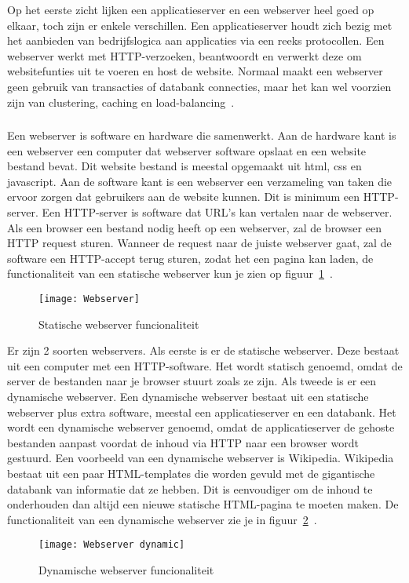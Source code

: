 Op het eerste zicht lijken een applicatieserver en een webserver heel goed op elkaar, toch zijn er enkele verschillen. Een applicatieserver houdt zich bezig met het aanbieden van bedrijfslogica aan applicaties via een reeks protocollen. Een webserver werkt met HTTP-verzoeken, beantwoordt en verwerkt deze om websitefunties uit te voeren en host de website. Normaal maakt een webserver geen gebruik van transacties of databank connecties, maar het kan wel voorzien zijn van clustering, caching en load-balancing~\autocite{ProTeam2018}.

\subsubsection{}
\label{subsubsec:Webserver}
Een webserver is software en hardware die samenwerkt. Aan de hardware kant is een webserver een computer dat webserver software opslaat en een website bestand bevat. Dit website bestand is meestal opgemaakt uit html, css en javascript. Aan de software kant is een webserver een verzameling van taken die ervoor zorgen dat gebruikers aan de website kunnen. Dit is minimum een HTTP-server. Een HTTP-server is software dat URL's kan vertalen naar de webserver. Als een browser een bestand nodig heeft op een webserver, zal de browser een HTTP request sturen. Wanneer de request naar de juiste webserver gaat, zal de software een HTTP-accept terug sturen, zodat het een pagina kan laden, de functionaliteit van een statische webserver kun je zien op figuur~\ref{fig:2.2}~\autocite{MDN2021}. 
\begin{figure}
    \texttt{[image: Webserver]}
    \caption{Statische webserver funcionaliteit\autocite{MDN2021} \label{fig:2.2}} 
\end{figure}

Er zijn 2 soorten webservers. Als eerste is er de statische webserver. Deze bestaat uit een computer met een HTTP-software. Het wordt statisch genoemd, omdat de server de bestanden naar je browser stuurt zoals ze zijn. Als tweede is er een dynamische webserver. Een dynamische webserver bestaat uit een statische webserver plus extra software, meestal een applicatieserver en een databank. Het wordt een dynamische webserver genoemd, omdat de applicatieserver de gehoste bestanden aanpast voordat de inhoud via HTTP naar een browser wordt gestuurd. Een voorbeeld van een dynamische webserver is Wikipedia. Wikipedia bestaat uit een paar HTML-templates die worden gevuld met de gigantische databank van informatie dat ze hebben. Dit is eenvoudiger om de inhoud te onderhouden dan altijd een nieuwe statische HTML-pagina te moeten maken. De functionaliteit van een dynamische webserver zie je in figuur~\ref{fig:2.3}~\autocite{MDN2021}.
\begin{figure}
    \texttt{[image: Webserver dynamic]}
    \caption{Dynamische webserver funcionaliteit\autocite{GeeksforGeeks2020} \label{fig:2.3}}
\end{figure}
